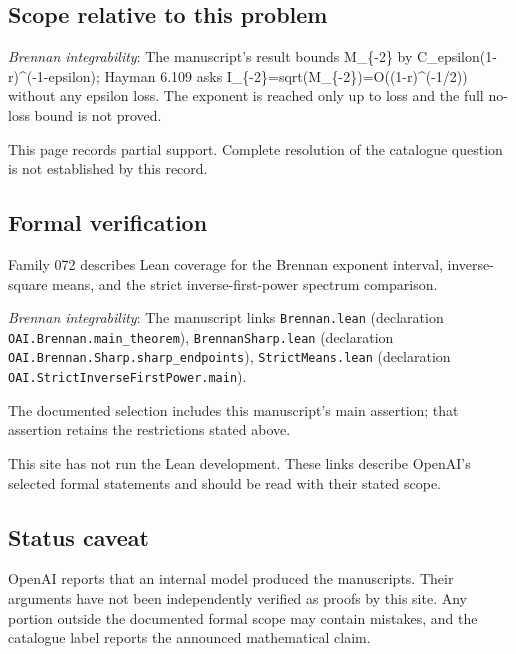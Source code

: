 \documentclass[11pt]{article}
\begin{document}
\subsection{Scope relative to this problem}
\textit{Brennan integrability}: The manuscript’s result bounds M\_\{-2\} by C\_epsilon(1-r)\textasciicircum{}(-1-epsilon); Hayman 6.109 asks I\_\{-2\}=sqrt(M\_\{-2\})=O((1-r)\textasciicircum{}(-1/2)) without any epsilon loss. The exponent is reached only up to loss and the full no-loss bound is not proved.

This page records partial support. Complete resolution of the catalogue question is not established by this record.

\subsection{Formal verification}
Family 072 describes Lean coverage for the Brennan exponent interval, inverse-square means, and the strict inverse-first-power spectrum comparison.

\textit{Brennan integrability}: The manuscript links \texttt{Brennan.lean} (declaration \texttt{OAI.Brennan.main\_theorem}), \texttt{BrennanSharp.lean} (declaration \texttt{OAI.Brennan.Sharp.sharp\_endpoints}), \texttt{StrictMeans.lean} (declaration \texttt{OAI.StrictInverseFirstPower.main}).

The documented selection includes this manuscript’s main assertion; that assertion retains the restrictions stated above.

This site has not run the Lean development. These links describe OpenAI’s selected formal statements and should be read with their stated scope.

\subsection{Status caveat}
OpenAI reports that an internal model produced the manuscripts. Their arguments have not been independently verified as proofs by this site. Any portion outside the documented formal scope may contain mistakes, and the catalogue label reports the announced mathematical claim.
\end{document}
